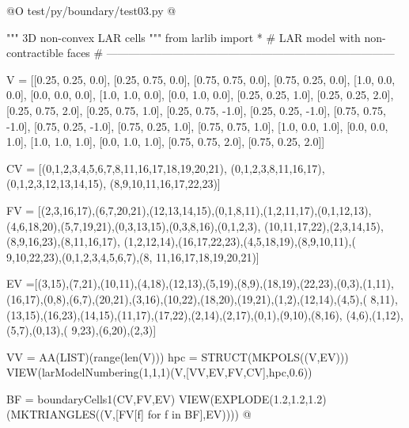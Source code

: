 \documentclass[11pt,oneside]{article}	%
\begin{document}
@O test/py/boundary/test03.py
@{""" 3D non-convex LAR cells """
from larlib import *
# LAR model with non-contractible faces
# ------------------------------------------------------------------------------

V = [[0.25, 0.25, 0.0], [0.25, 0.75, 0.0], [0.75, 0.75, 0.0], [0.75, 0.25, 0.0], [1.0, 
0.0, 0.0], [0.0, 0.0, 0.0], [1.0, 1.0, 0.0], [0.0, 1.0, 0.0], [0.25, 0.25, 1.0], [0.25, 
0.25, 2.0], [0.25, 0.75, 2.0], [0.25, 0.75, 1.0], [0.25, 0.75, -1.0], [0.25, 0.25, 
-1.0], [0.75, 0.75, -1.0], [0.75, 0.25, -1.0], [0.75, 0.25, 1.0], [0.75, 0.75, 1.0], 
[1.0, 0.0, 1.0], [0.0, 0.0, 1.0], [1.0, 1.0, 1.0], [0.0, 1.0, 1.0], [0.75, 0.75, 2.0], 
[0.75, 0.25, 2.0]]

CV = [(0,1,2,3,4,5,6,7,8,11,16,17,18,19,20,21), 
(0,1,2,3,8,11,16,17),
(0,1,2,3,12,13,14,15), 
(8,9,10,11,16,17,22,23)]

FV = [(2,3,16,17),(6,7,20,21),(12,13,14,15),(0,1,8,11),(1,2,11,17),(0,1,12,13),
(4,6,18,20),(5,7,19,21),(0,3,13,15),(0,3,8,16),(0,1,2,3),
(10,11,17,22),(2,3,14,15),(8,9,16,23),(8,11,16,17),
(1,2,12,14),(16,17,22,23),(4,5,18,19),(8,9,10,11),(
9,10,22,23),(0,1,2,3,4,5,6,7),(8, 11,16,17,18,19,20,21)]

EV =[(3,15),(7,21),(10,11),(4,18),(12,13),(5,19),(8,9),(18,19),(22,23),(0,3),(1,11),
(16,17),(0,8),(6,7),(20,21),(3,16),(10,22),(18,20),(19,21),(1,2),(12,14),(4,5),(
8,11),(13,15),(16,23),(14,15),(11,17),(17,22),(2,14),(2,17),(0,1),(9,10),(8,16),
(4,6),(1,12),(5,7),(0,13),( 9,23),(6,20),(2,3)]

VV = AA(LIST)(range(len(V)))
hpc = STRUCT(MKPOLS((V,EV)))
VIEW(larModelNumbering(1,1,1)(V,[VV,EV,FV,CV],hpc,0.6))

BF = boundaryCells1(CV,FV,EV)
VIEW(EXPLODE(1.2,1.2,1.2)(MKTRIANGLES((V,[FV[f] for f in BF],EV))))
@}
\end{document}
